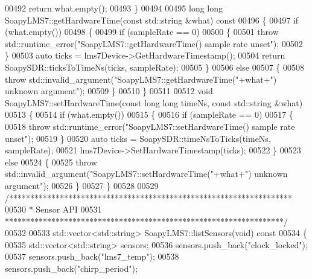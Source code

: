 \begin{DoxyCode}
{{{{{{{{{{{{{{00492     \textcolor{keywordflow}{return} what.empty();
00493 \}
00494 
00495 \textcolor{keywordtype}{long} \textcolor{keywordtype}{long} SoapyLMS7::getHardwareTime(\textcolor{keyword}{const} std::string &what)\textcolor{keyword}{ const}
00496 \textcolor{keyword}{}\{
00497     \textcolor{keywordflow}{if} (what.empty())
00498     \{
00499         \textcolor{keywordflow}{if} (sampleRate == 0)
00500         \{
00501             \textcolor{keywordflow}{throw} std::runtime\_error(\textcolor{stringliteral}{"SoapyLMS7::getHardwareTime() sample rate unset"});
00502         \}
00503         \textcolor{keyword}{auto} ticks = lms7Device->GetHardwareTimestamp();
00504         \textcolor{keywordflow}{return} SoapySDR::ticksToTimeNs(ticks, sampleRate);
00505     \}
00506     \textcolor{keywordflow}{else}
00507     \{
00508         \textcolor{keywordflow}{throw} std::invalid\_argument(\textcolor{stringliteral}{"SoapyLMS7::getHardwareTime("}+what+\textcolor{stringliteral}{") unknown argument"});
00509     \}
00510 \}
00511 
00512 \textcolor{keywordtype}{void} SoapyLMS7::setHardwareTime(\textcolor{keyword}{const} \textcolor{keywordtype}{long} \textcolor{keywordtype}{long} timeNs, \textcolor{keyword}{const} std::string &what)
00513 \{
00514     \textcolor{keywordflow}{if} (what.empty())
00515     \{
00516         \textcolor{keywordflow}{if} (sampleRate == 0)
00517         \{
00518             \textcolor{keywordflow}{throw} std::runtime\_error(\textcolor{stringliteral}{"SoapyLMS7::setHardwareTime() sample rate unset"});
00519         \}
00520         \textcolor{keyword}{auto} ticks = SoapySDR::timeNsToTicks(timeNs, sampleRate);
00521         lms7Device->SetHardwareTimestamp(ticks);
00522     \}
00523     \textcolor{keywordflow}{else}
00524     \{
00525         \textcolor{keywordflow}{throw} std::invalid\_argument(\textcolor{stringliteral}{"SoapyLMS7::setHardwareTime("}+what+\textcolor{stringliteral}{") unknown argument"});
00526     \}
00527 \}
00528 
00529 \textcolor{comment}{/*******************************************************************}
00530 \textcolor{comment}{ * Sensor API}
00531 \textcolor{comment}{ ******************************************************************/}
00532 
00533 std::vector<std::string> SoapyLMS7::listSensors(\textcolor{keywordtype}{void})\textcolor{keyword}{ const}
00534 \textcolor{keyword}{}\{
00535     std::vector<std::string> sensors;
00536     sensors.push\_back(\textcolor{stringliteral}{"clock\_locked"});
00537     sensors.push\_back(\textcolor{stringliteral}{"lms7\_temp"});
00538     sensors.push\_back(\textcolor{stringliteral}{"chirp\_period"});
}}}}}}}}}}}}}}
\end{DoxyCode}
